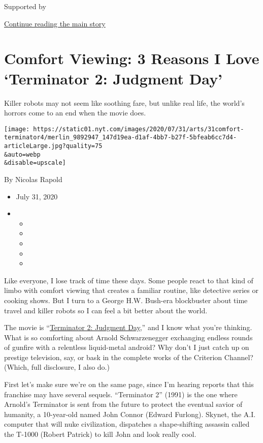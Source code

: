 Supported by

\protect\hyperlink{after-sponsor}{Continue reading the main story}

\hypertarget{comfort-viewing-3-reasons-i-love-terminator-2-judgment-day}{%
\section{Comfort Viewing: 3 Reasons I Love `Terminator 2: Judgment
Day'}\label{comfort-viewing-3-reasons-i-love-terminator-2-judgment-day}}

Killer robots may not seem like soothing fare, but unlike real life, the
world's horrors come to an end when the movie does.

\texttt{[image: https://static01.nyt.com/images/2020/07/31/arts/31comfort-terminator4/merlin\_9892947\_147d19ea-d1af-4bb7-b27f-5bfeab6cc7d4-articleLarge.jpg?quality=75\\\&auto=webp\\\&disable=upscale]}

By Nicolas Rapold

\begin{itemize}
\item
  July 31, 2020
\item
  \begin{itemize}
  \item
  \item
  \item
  \item
  \item
  \end{itemize}
\end{itemize}

Like everyone, I lose track of time these days. Some people react to
that kind of limbo with comfort viewing that creates a familiar routine,
like detective series or cooking shows. But I turn to a George H.W.
Bush-era blockbuster about time travel and killer robots so I can feel a
bit better about the world.

The movie is
``\href{https://www.nytimes.com/1991/07/03/movies/review-film-in-new-terminator-the-forces-of-good-seek-peace-violently.html}{Terminator
2: Judgment Day},'' and I know what you're thinking. What is so
comforting about Arnold Schwarzenegger exchanging endless rounds of
gunfire with a relentless liquid-metal android? Why don't I just catch
up on prestige television, say, or bask in the complete works of the
Criterion Channel? (Which, full disclosure, I also do.)

First let's make sure we're on the same page, since I'm hearing reports
that this franchise may have several sequels. ``Terminator 2'' (1991) is
the one where Arnold's Terminator is sent from the future to protect the
eventual savior of humanity, a 10-year-old named John Connor (Edward
Furlong). Skynet, the A.I. computer that will nuke civilization,
dispatches a shape-shifting assassin called the T-1000 (Robert Patrick)
to kill John and look really cool.

